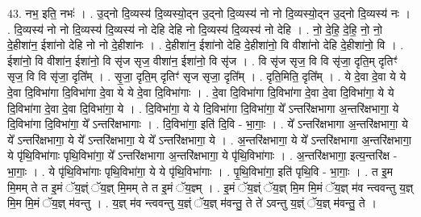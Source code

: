 \documentclass[17pt]{extarticle}
\begin{document}
43. नभ॒ इति॒ नभः॑ । . उ॒द्नो दि॒व्यस्य॑ दि॒व्यस्यो॒द्न उ॒द्नो दि॒व्यस्य॑ नो नो दि॒व्यस्यो॒द्न उ॒द्नो दि॒व्यस्य॑ नः । . दि॒व्यस्य॑ नो नो दि॒व्यस्य॑ दि॒व्यस्य॑ नो देहि देहि नो दि॒व्यस्य॑ दि॒व्यस्य॑ नो देहि । . नो॒ दे॒हि॒ दे॒हि॒ नो॒ नो॒ दे॒हीशा॑न॒ ईशा॑नो देहि नो नो दे॒हीशा॑नः । . दे॒हीशा॑न॒ ईशा॑नो देहि दे॒हीशा॑नो॒ वि वीशा॑नो देहि दे॒हीशा॑नो॒ वि । . ईशा॑नो॒ वि वीशा॑न॒ ईशा॑नो॒ वि सृ॑ज सृज॒ वीशा॑न॒ ईशा॑नो॒ वि सृ॑ज । . वि सृ॑ज सृज॒ वि वि सृ॑जा॒ दृति॒म् दृतिꣳ॑ सृज॒ वि वि सृ॑जा॒ दृति᳚म् । . सृ॒जा॒ दृति॒म् दृतिꣳ॑ सृज सृजा॒ दृति᳚म् । . दृति॒मिति॒ दृति᳚म् । . ये दे॒वा दे॒वा ये ये दे॒वा दि॒विभा॑गा दि॒विभा॑गा दे॒वा ये ये दे॒वा दि॒विभा॑गाः । . दे॒वा दि॒विभा॑गा दि॒विभा॑गा दे॒वा दे॒वा दि॒विभा॑गा॒ ये ये दि॒विभा॑गा दे॒वा दे॒वा दि॒विभा॑गा॒ ये । . दि॒विभा॑गा॒ ये ये दि॒विभा॑गा दि॒विभा॑गा॒ ये᳚ ऽन्तरि॑क्षभागा अ॒न्तरि॑क्षभागा॒ ये दि॒विभा॑गा दि॒विभा॑गा॒ ये᳚ ऽन्तरि॑क्षभागाः । . दि॒विभा॑गा॒ इति॑ दि॒वि - भा॒गाः॒ । . ये᳚ ऽन्तरि॑क्षभागा अ॒न्तरि॑क्षभागा॒ ये ये᳚ ऽन्तरि॑क्षभागा॒ ये ये᳚ ऽन्तरि॑क्षभागा॒ ये ये᳚ ऽन्तरि॑क्षभागा॒ ये । . अ॒न्तरि॑क्षभागा॒ ये ये᳚ ऽन्तरि॑क्षभागा अ॒न्तरि॑क्षभागा॒ ये पृ॑थि॒विभा॑गाः पृथि॒विभा॑गा॒ ये᳚ ऽन्तरि॑क्षभागा अ॒न्तरि॑क्षभागा॒ ये पृ॑थि॒विभा॑गाः । . अ॒न्तरि॑क्षभागा॒ इत्य॒न्तरि॑क्ष - भा॒गाः॒ । . ये पृ॑थि॒विभा॑गाः पृथि॒विभा॑गा॒ ये ये पृ॑थि॒विभा॑गाः । . पृ॒थि॒विभा॑गा॒ इति॑ पृथि॒वि - भा॒गाः॒ । . त इ॒म मि॒मम् ते त इ॒मं ॅय॒ज्ञ्ं ॅय॒ज्ञ् मि॒मम् ते त इ॒मं ॅय॒ज्ञ्म् । . इ॒मं ॅय॒ज्ञ्ं ॅय॒ज्ञ् मि॒म मि॒मं ॅय॒ज्ञ् म॑व न्त्ववन्तु य॒ज्ञ् मि॒म मि॒मं ॅय॒ज्ञ् म॑वन्तु । . य॒ज्ञ् म॑व न्त्ववन्तु य॒ज्ञ्ं ॅय॒ज्ञ् म॑वन्तु॒ ते ते॑ ऽवन्तु य॒ज्ञ्ं ॅय॒ज्ञ् म॑वन्तु॒ ते । \newline
\end{document}
